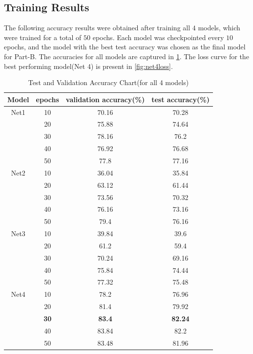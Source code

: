 \documentclass{article}
\begin{document}
\subsection{Training Results}
The following accuracy results were obtained after training all $4$ models, which were trained for a total of $50$ epochs. Each model was checkpointed every $10$ epochs, and the model with the best test accuracy was chosen as the final model for Part-B. The accuracies for all models are captured in \cref{table:test-acc}. The loss curve for the best performing model(Net 4) is present in \cref{fig:net4loss}.
\begin{table}[ht]
	\caption{Test and Validation Accuracy Chart(for all 4 models)}%
	\centering %
	\begin{tabular}{|c | c | c | c|}%
		\hline\hline      
		Model & epochs & validation accuracy(\%) & test accuracy(\%) \\ [0.5ex]
		\hline  
		Net1&              10 &           70.16 &          70.28 \\
			&              20 &           75.88 &          74.64 \\
			&              30 &           78.16 &           76.2 \\
			&              40 &           76.92 &          76.68 \\
			&              50 &            77.8 &          77.16 \\
		\hline
		Net2&              10 &          36.04  &         35.84 \\
			&              20 &          63.12  &         61.44 \\
			&              30 &          73.56  &         70.32 \\
			&              40 &          76.16  &         73.16 \\
			&              50 &           79.4  &         76.16 \\
		\hline
		Net3&              10 &          39.84 &           39.6 \\
			&              20 &           61.2 &           59.4 \\
			&              30 &          70.24 &          69.16 \\
			&              40 &          75.84 &          74.44 \\
			&              50 &          77.32 &          75.48 \\
		\hline
		Net4&              10 &           78.2 &          76.96 \\
			&              20 &           81.4 &          79.92 \\
			&              \textbf{30} &           \textbf{83.4} &          \textbf{82.24} \\
			&              40 &          83.84 &           82.2 \\
			&              50 &          83.48 &          81.96 \\[1ex]
		\hline
	\end{tabular}
	\label{table:test-acc}%
\end{table}
\end{document}
